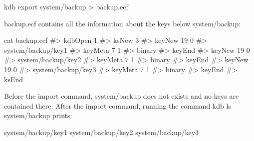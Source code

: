 \begin{DoxyCode}
kdb export system/backup > backup.ecf
\end{DoxyCode}


{\ttfamily backup.\+ecf} contains all the information about the keys below {\ttfamily system/backup}\+:


\begin{DoxyCode}
cat backup.ecf
#> kdbOpen 1
#> ksNew 3
#> keyNew 19 0
#> system/backup/key1
#> keyMeta 7 1
#> binary
#> keyEnd
#> keyNew 19 0
#> system/backup/key2
#> keyMeta 7 1
#> binary
#> keyEnd
#> keyNew 19 0
#> system/backup/key3
#> keyMeta 7 1
#> binary
#> keyEnd
#> ksEnd
\end{DoxyCode}


Before the import command, {\ttfamily system/backup} does not exists and no keys are contained there. After the import command, running the command {\ttfamily kdb ls system/backup} prints\+:


\begin{DoxyCode}
system/backup/key1
system/backup/key2
system/backup/key3
\end{DoxyCode}
 